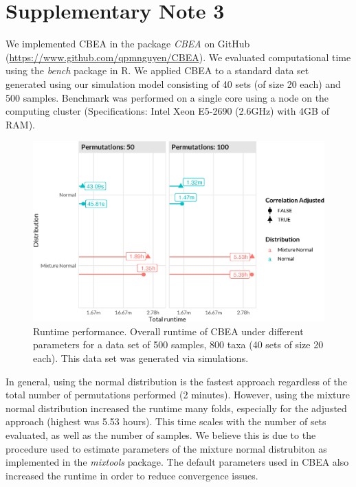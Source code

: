 \clearpage
\section{Supplementary Note 3} \label{appC_note3}

We implemented CBEA in the package \emph{CBEA} on GitHub (\url{https://www.github.com/qpmnguyen/CBEA}). We evaluated computational time using the \emph{bench} package in R. We applied CBEA to a standard data set generated using our simulation model consisting of 40 sets (of size 20 each) and 500 samples. Benchmark was performed on a single core using a node on the computing cluster (Specifications: Intel Xeon E5-2690 (2.6GHz) with 4GB of RAM). 

\begin{figure}[!h]
    \centering
    \includegraphics[width=\linewidth]{figures/appC_fs6.eps}
    \caption[CBEA Runtime performance]{Runtime performance. Overall runtime of CBEA under different parameters for a data set of 500 samples, 800 taxa (40 sets of size 20 each). This data set was generated via simulations.}
    \label{fig:c6}
\end{figure}

In general, using the normal distribution is the fastest approach regardless of the total number of permutations performed (2 minutes). However, using the mixture normal distribution increased the runtime many folds, especially for the adjusted approach (highest was 5.53 hours). This time scales with the number of sets evaluated, as well as the number of samples. We believe this is due to the procedure used to estimate parameters of the mixture normal distrubiton as implemented in the \emph{mixtools} package. The default parameters used in CBEA also increased the runtime in order to reduce convergence issues.  

